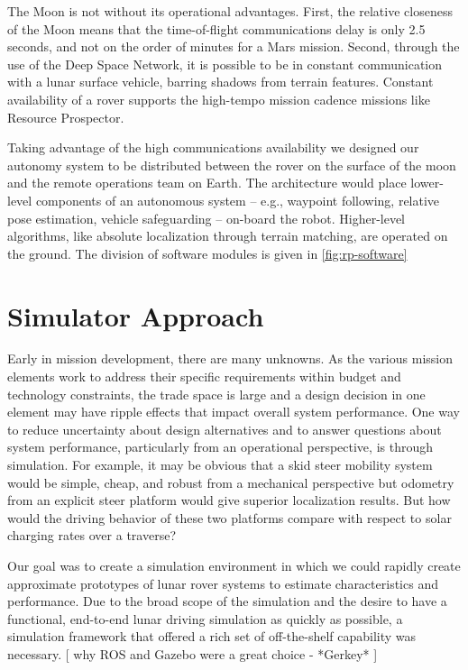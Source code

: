 \documentclass[twocolumn,letterpaper]{IEEEAerospaceCLS}  %
\begin{document}
The Moon is not without its operational advantages.  First, the relative closeness of the Moon means that the time-of-flight communications delay is only 2.5 seconds, and not on the order of minutes for a Mars mission.  Second, through the use of the Deep Space Network, it is possible to be in constant communication with a lunar surface vehicle, barring shadows from terrain features.  Constant availability of a rover supports the high-tempo mission cadence missions like Resource Prospector.


Taking advantage of the high communications availability we designed our autonomy system to be distributed between the rover on the surface of the moon and the remote operations team on Earth.  The architecture would place lower-level components of an autonomous system -- e.g., waypoint following, relative pose estimation, vehicle safeguarding  -- on-board the robot.  Higher-level algorithms, like absolute localization through terrain matching, are operated on the ground.  The division of software modules is given in \cref{fig:rp-software}



\section{Simulator Approach}

Early in mission development, there are many unknowns. As the various mission elements work to address their specific requirements within budget and technology constraints, the trade space is large and a design decision in one element may have ripple effects that impact overall system performance. One way to reduce uncertainty about design alternatives and to answer questions about system performance, particularly from an operational perspective, is through simulation. For example, it may be obvious that a skid steer mobility system would be simple, cheap, and robust from a mechanical perspective but odometry from an explicit steer platform would give superior localization results. But how would the driving behavior of these two platforms compare with respect to solar charging rates over a traverse? 

Our goal was to create a simulation environment in which we could rapidly create approximate prototypes of lunar rover systems to estimate characteristics and performance. Due to the broad scope of the simulation and the desire to have a functional, end-to-end lunar driving simulation as quickly as possible, a simulation framework that offered a rich set of off-the-shelf capability was necessary. [ why ROS and Gazebo were a great choice - *Gerkey* ] 
\end{document}
